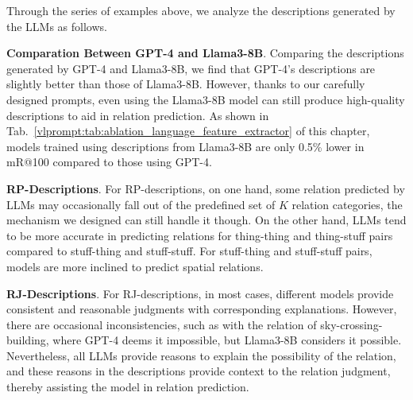 Through the series of examples above, we analyze the descriptions generated by the LLMs as follows.

\noindent \textbf{Comparation Between GPT-4 and Llama3-8B}.
Comparing the descriptions generated by GPT-4 and Llama3-8B, we find that GPT-4's descriptions are slightly better than those of Llama3-8B.
However, thanks to our carefully designed prompts, even using the Llama3-8B model can still produce high-quality descriptions to aid in relation prediction.
As shown in 
Tab.~\ref{vlprompt:tab:ablation_language_feature_extractor} 
of this chapter, models trained using descriptions from Llama3-8B are only 0.5\% lower in mR@100 compared to those using GPT-4.

\noindent \textbf{RP-Descriptions}.
For RP-descriptions, on one hand, some relation predicted by LLMs may occasionally fall out of the predefined set of $K$ relation categories, the mechanism we designed can still handle it though. 
On the other hand, LLMs tend to be more accurate in predicting relations for thing-thing and thing-stuff pairs compared to stuff-thing and stuff-stuff.
For stuff-thing and stuff-stuff pairs, models are more inclined to predict spatial relations.

\noindent \textbf{RJ-Descriptions}.
For RJ-descriptions, in most cases, different models provide consistent and reasonable judgments with corresponding explanations.
However, there are occasional inconsistencies, such as with the relation of sky-crossing-building, where GPT-4 deems it impossible, but Llama3-8B considers it possible.
Nevertheless, all LLMs provide reasons to explain the possibility of the relation, and these reasons in the descriptions provide context to the relation judgment, thereby assisting the model in relation prediction.

